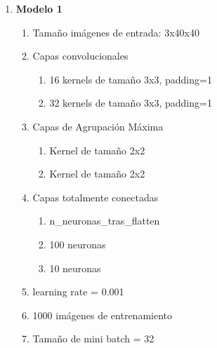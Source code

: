 \begin{enumerate}
	\newpage
	\item \textbf{Modelo 1}
	\begin{enumerate}[label=\textbullet, nosep]
		\item Tamaño imágenes de entrada: 3x40x40
		\item Capas convolucionales
		\begin{enumerate}[label=\textbullet, nosep]
			\item 16 kernels de tamaño 3x3, padding=1
			\item 32 kernels de tamaño 3x3, padding=1
		\end{enumerate}
		\item Capas de Agrupación Máxima
		\begin{enumerate}[label=\textbullet, nosep]
			\item Kernel de tamaño 2x2
			\item Kernel de tamaño 2x2
		\end{enumerate}
		\item Capas totalmente conectadas
		\begin{enumerate}[label=\textbullet, nosep]
			\item n\_neuronas\_tras\_flatten
			\item 100 neuronas
			\item 10 neuronas
		\end{enumerate}
		\item learning rate = 0.001
		\item 1000 imágenes de entrenamiento
		\item Tamaño de mini batch = 32
	\end{enumerate}
	

\end{enumerate}

